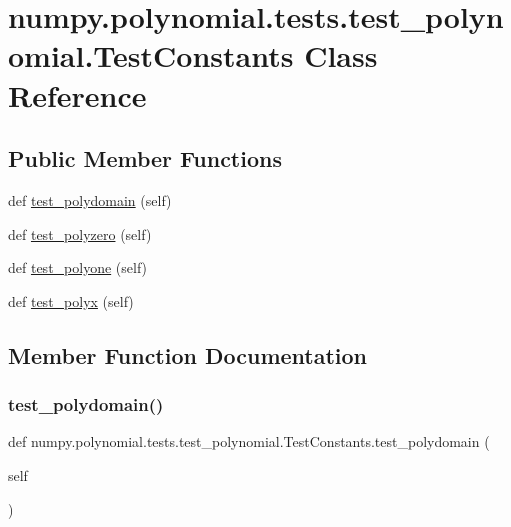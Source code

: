\hypertarget{classnumpy_1_1polynomial_1_1tests_1_1test__polynomial_1_1TestConstants}{}\section{numpy.\+polynomial.\+tests.\+test\+\_\+polynomial.\+Test\+Constants Class Reference}
\label{classnumpy_1_1polynomial_1_1tests_1_1test__polynomial_1_1TestConstants}
\subsection*{Public Member Functions}
\begin{DoxyCompactItemize}
\item 
def \hyperlink{classnumpy_1_1polynomial_1_1tests_1_1test__polynomial_1_1TestConstants_accd97a8ddd831bf3998474e1fdf1ce2c}{test\+\_\+polydomain} (self)
\item 
def \hyperlink{classnumpy_1_1polynomial_1_1tests_1_1test__polynomial_1_1TestConstants_a95c89480463a62ff6b7b999f80f779ef}{test\+\_\+polyzero} (self)
\item 
def \hyperlink{classnumpy_1_1polynomial_1_1tests_1_1test__polynomial_1_1TestConstants_a24fea3b5396d2c2c1942eeabfc3cf285}{test\+\_\+polyone} (self)
\item 
def \hyperlink{classnumpy_1_1polynomial_1_1tests_1_1test__polynomial_1_1TestConstants_a6cddc933aaea4478316b5b174f927efb}{test\+\_\+polyx} (self)
\end{DoxyCompactItemize}


\subsection{Member Function Documentation}
\mbox{\label{classnumpy_1_1polynomial_1_1tests_1_1test__polynomial_1_1TestConstants_accd97a8ddd831bf3998474e1fdf1ce2c}} 
\subsubsection{\texorpdfstring{test\+\_\+polydomain()}{test\_polydomain()}}
{\footnotesize\ttfamily def numpy.\+polynomial.\+tests.\+test\+\_\+polynomial.\+Test\+Constants.\+test\+\_\+polydomain (\begin{DoxyParamCaption}\item[{}]{self }\end{DoxyParamCaption})}

